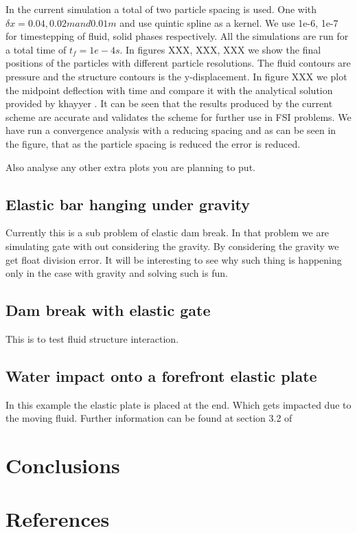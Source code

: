 \documentclass[preprint,12pt]{elsarticle}
\begin{document}
In the current simulation a total of two particle spacing is used. One with
$\delta x = 0.04 , 0.02m and 0.01 m$ and use quintic spline as a kernel. We
use 1e-6, 1e-7 for timestepping of fluid, solid phases respectively. All the
simulations are run for a total time of $t_f = 1e-4s$. In figures XXX, XXX,
XXX we show the final positions of the particles with different particle
resolutions. The fluid contours are pressure and the structure contours is the
y-displacement. In figure XXX we plot the midpoint deflection with time and
compare it with the analytical solution provided by khayyer . It can be seen
that the results produced by the current scheme are accurate and validates the
scheme for further use in FSI problems. We have run a convergence analysis
with a reducing spacing and as can be seen in the figure, that as the particle
spacing is reduced the error is reduced.

Also analyse any other extra plots you are planning to put.




\subsection{Elastic bar hanging under gravity}
\label{sec:elastic-bar-hanging}


Currently this is a sub problem of elastic dam break. In that problem we are
simulating gate with out considering the gravity. By considering the gravity
we get float division error. It will be interesting to see why such thing is
happening only in the case with gravity and solving such is fun.


\subsection{Dam break with elastic gate}
\label{sec:dam-break-elastic-gate}

This is to test fluid structure interaction.


\subsection{Water impact onto a forefront elastic plate}
\label{sec:water-impact-forefront}

In this example the elastic plate is placed at the end. Which gets
impacted due to the moving fluid. Further information can be found at
section 3.2 of \cite{liu2013numerical}






\section{Conclusions}
\label{sec:conclusions}


\section*{References}


\end{document}
